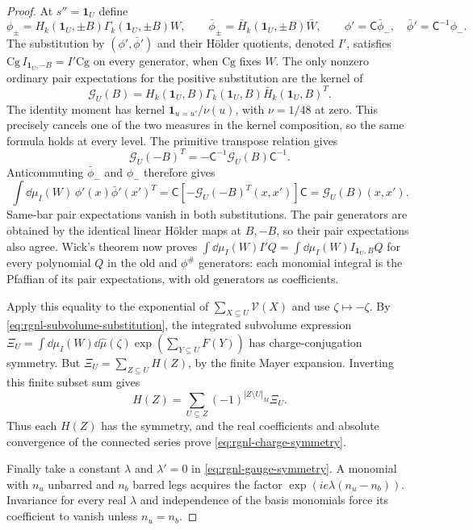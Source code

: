 \begin{proof}
At $s''=\mathbf1_U$ define
\[
 \phi_\pm=H_k(\mathbf1_U,\pm B)\Gamma_k(\mathbf1_U,\pm B)W,
 \qquad
 \bar\phi_\pm=\bar H_k(\mathbf1_U,\pm B)\bar W,
 \qquad
 \phi'=\mathsf C\bar\phi_-,\quad
 \bar\phi'=\mathsf C^{-1}\phi_-.
\]
The substitution by $(\phi',\bar\phi')$ and their
H\"older quotients, denoted $I'$, satisfies
$\mathrm{Cg}\,I_{\mathbf1_U,-B}=I'\mathrm{Cg}$
on every generator, when $\mathrm{Cg}$ fixes $W$.
The only nonzero ordinary pair expectations for the
positive substitution are the kernel of
\[
 \mathcal G_U(B)
        =H_k(\mathbf1_U,B)\Gamma_k(\mathbf1_U,B)
                                            \bar H_k(\mathbf1_U,B)^T.
\]
The identity moment has kernel
$\mathbf1_{u=u'}/\nu(u)$, with $\nu=1/48$ at zero.
This precisely cancels one of the two measures in
the kernel composition, so the same formula holds
at every level. The primitive transpose relation gives
\[
 \mathcal G_U(-B)^T
                      =-\mathsf C^{-1}\mathcal G_U(B)\mathsf C^{-1}.
\]
Anticommuting $\bar\phi_-$ and $\phi_-$ therefore gives
\[
 \int\dd\mu_I(W)\,\phi'(x)\bar\phi'(x')^T
     =\mathsf C[-\mathcal G_U(-B)^T(x,x')]\mathsf C
     =\mathcal G_U(B)(x,x').
\]
Same-bar pair expectations vanish in both substitutions.
The pair generators are obtained by the identical
linear H\"older maps at $B,-B$, so their pair expectations
also agree. Wick's theorem now proves
$\int\dd\mu_I(W)I'Q=\int\dd\mu_I(W)I_{\mathbf1_U,B}Q$
for every polynomial $Q$ in the old and $\phi^\#$
generators: each monomial integral is the Pfaffian of
its pair expectations, with old generators as coefficients.

Apply this equality to the exponential of
$\sum_{X\subseteq U}\mathcal V(X)$ and use
$\zeta\mapsto-\zeta$. By
\eqref{eq:rgnl-subvolume-substitution}, the integrated
subvolume expression
$\Xi_U=\int\dd\mu_I(W)\dd\widehat\mu(\zeta)
\exp(\sum_{Y\subseteq U}F(Y))$
has charge-conjugation symmetry.
But $\Xi_U=\sum_{Z\subseteq U}H(Z)$, by the finite
Mayer expansion. Inverting this finite subset sum gives
\[
 H(Z)=\sum_{U\subseteq Z}(-1)^{|Z\setminus U|_M}\Xi_U.
\]
Thus each $H(Z)$ has the symmetry, and the real
coefficients and absolute convergence of the connected
series prove \eqref{eq:rgnl-charge-symmetry}.

Finally take a constant $\lambda$ and $\lambda'=0$
in \eqref{eq:rgnl-gauge-symmetry}. A monomial with
$n_u$ unbarred and $n_b$ barred legs acquires the factor
$\exp(ie\lambda(n_u-n_b))$. Invariance for every real
$\lambda$ and independence of the basis monomials force
its coefficient to vanish unless $n_u=n_b$.
\end{proof}

